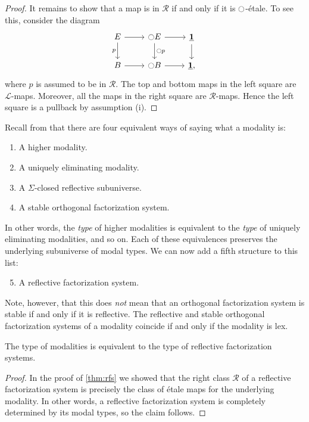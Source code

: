 \documentclass[9pt,twosided]{amsart}
\begin{document}
\begin{proof}
  It remains to show that a map is in $\mathcal{R}$ if and only if it is ${\ocircle}$-\'etale. To see this, consider the diagram
  \begin{equation*}
    \begin{tikzcd}
      E \arrow[d,swap,"p"] \arrow[r] & \modal E \arrow[d,"\modal p"] \arrow[r] & \unit \arrow[d] \\
      B \arrow[r] & \modal B \arrow[r] & \unit,
    \end{tikzcd}
  \end{equation*}
  where $p$ is assumed to be in $\mathcal{R}$. The top and bottom maps in the left square are $\mathcal{L}$-maps. Moreover, all the maps in the right square are $\mathcal{R}$-maps. Hence the left square is a pullback by assumption (i).
\end{proof}

Recall from \cite[Section 1]{RijkeSpittersShulman} that there are four equivalent ways of saying what a modality is:
\begin{enumerate}
\item A higher modality.
\item A uniquely eliminating modality.
\item A $\Sigma$-closed reflective subuniverse.
\item A stable orthogonal factorization system.
\end{enumerate}
In other words, the \emph{type} of higher modalities is equivalent to the \emph{type} of uniquely eliminating modalities, and so on. Each of these equivalences preserves the underlying subuniverse of modal types. We can now add a fifth structure to this list:
\begin{enumerate}
  \setcounter{enumi}{4}
\item A reflective factorization system.
\end{enumerate}
Note, however, that this does \emph{not} mean that an orthogonal factorization system is stable if and only if it is reflective. The reflective and stable orthogonal factorization systems of a modality coincide if and only if the modality is lex.

\begin{thm}
  The type of modalities is equivalent to the type of reflective factorization systems.
\end{thm}

\begin{proof}
  In the proof of \cref{thm:rfs} we showed that the right class $\mathcal{R}$ of a reflective factorization system is precisely the class of \'etale maps for the underlying modality. In other words, a reflective factorization system is completely determined by its modal types, so the claim follows.
\end{proof}
\end{document}
